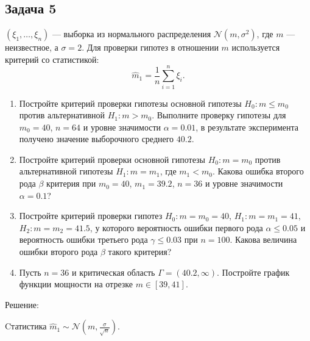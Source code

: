 \documentclass[a4paper,12pt]{article}
\newif\ifsolutions
\begin{document}
\ifsolutions Решение: \par
    \begin{enumerate}
        \item Тест Колмогорова для $E(2.023)$: статистика 0.21585 при аргументе 0.768, уровень значимости 0.26818.
        \item Тест Колмогорова для $R[0.043, 7.950]$: статистика 0.58862 при аргументе 2.11, уровень значимости 0.
        \item Тест Колмогорова--Смирнова: статистика 0.25 при аргументе 2.11, уровень значимости 0.58703.
    \end{enumerate}
\fi

\subsection*{Задача 5 \cite[206, 207, 210]{Efimov}}

$\left( \xi_1, \dots, \xi_n \right)$ --- выборка из нормального распределения $\mathcal{N} \left( m, \sigma^2 \right)$, где $m$ --- неизвестное,
а $\sigma = 2$. Для проверки гипотез в отношении $m$ используется критерий со статистикой:
\[
    \widehat{m}_1 = \frac{1}{n} \sum_{i=1}^n \xi_i .
\]
\begin{enumerate}
    \item Постройте критерий проверки гипотезы основной гипотезы $H_0: m \le m_0$ против альтернативной $H_1: m > m_0$. Выполните проверку гипотезы
          для $m_0 = 40$, $n = 64$ и уровне значимости $\alpha = 0.01$, в результате эксперимента получено значение выборочного среднего $40.2$.
    \item Постройте критерий проверки основной гипотезы $H_0: m = m_0$ против альтернативной гипотезы $H_1: m = m_1$, где $m_1 < m_0$. Какова ошибка
          второго рода $\beta$ критерия при $m_0 = 40$, $m_1 = 39.2$, $n=36$ и уровне значимости $\alpha = 0.1$?
    \item Постройте критерий проверки гипотез $H_0: m = m_0 = 40$, $H_1: m = m_1 = 41$, $H_2: m = m_2 = 41.5$, у которого вероятность ошибки первого
          рода $\alpha \le 0.05$ и вероятность ошибки третьего рода $\gamma \le 0.03$ при $n = 100$. Какова величина ошибки второго рода $\beta$
          такого критерия?
    \item Пусть $n=36$ и критическая область $\Gamma = (40.2, \infty)$. Постройте график функции мощности на отрезке $m \in [39, 41]$.
\end{enumerate}

\ifsolutions Решение: \par
    Cтатистика $\widehat{m}_1 \sim \mathcal{N} (m, \frac{\sigma}{\sqrt{n}})$.
\end{document}
